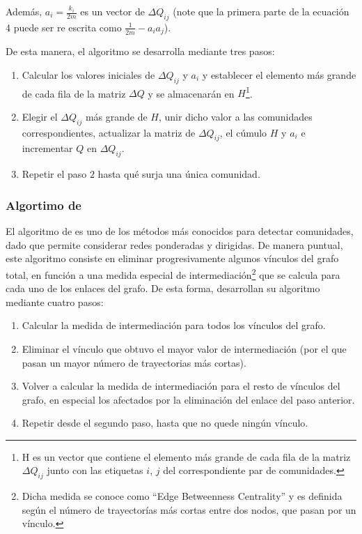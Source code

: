 \documentclass[12pt,letter]{article}
\begin{document}
\vspace{0.5cm}

Además, $a_i = \frac{k_i}{2m}$ es un vector de $\Delta Q_{ij}$ (note que la primera parte de la ecuación 4 puede ser re escrita como $\frac{1}{2m}-a_ia_j$).

\vspace{0.5cm}

De esta manera, el algoritmo se desarrolla mediante tres pasos:
\begin{enumerate}
\item Calcular los valores iniciales de $\Delta Q_{ij}$ y $a_i$ y establecer el elemento más grande de cada fila de la matriz $\Delta Q$ y se almacenarán en $H$\footnote{H es un vector que contiene el elemento más grande de cada fila de la matriz $\Delta Q_{ij}$ junto con las etiquetas $i$, $j$ del correspondiente par de comunidades.}.
\item Elegir el $\Delta Q_{ij}$ más grande de $H$, unir dicho valor a las comunidades correspondientes, actualizar la matriz de $\Delta Q_{ij}$, el cúmulo $H$ y $a_i$ e incrementar $Q$ en $\Delta Q_{ij}$.
\item Repetir el paso $2$ hasta qué surja una única comunidad.

\end{enumerate}


\subsubsection{Algortimo de \cite{Girvan1, Girvan2}}

El algoritmo de \cite{Girvan1, Girvan2} es uno de los métodos más conocidos para detectar comunidades, dado que permite considerar redes ponderadas y dirigidas. De manera puntual, este algoritmo consiste en eliminar progresivamente algunos vínculos del grafo total, en función a una medida especial de intermediación\footnote{Dicha medida se conoce como ``Edge Betweenness Centrality'' y es definida según el número de trayectorías más cortas entre dos nodos, que pasan por un vínculo.} que se calcula para cada uno de los enlaces del grafo. De esta forma, \cite{Girvan1, Girvan2} desarrollan su algoritmo mediante cuatro pasos:

\begin{enumerate}
\item Calcular la medida de intermediación para todos los vínculos del grafo.
\item Eliminar el vínculo que obtuvo el mayor valor de intermediación (por el que pasan un mayor número de trayectorias más cortas).
\item Volver a calcular la medida de intermediación para el resto de vínculos del grafo, en especial los afectados por la eliminación del enlace del paso anterior.
\item Repetir desde el segundo paso, hasta que no quede ningún vínculo.
\end{enumerate}
\end{document}
